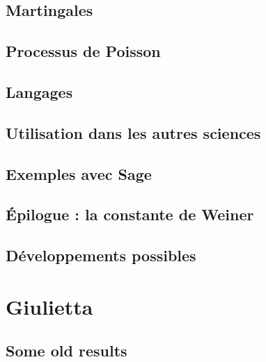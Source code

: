 \documentclass[a4paper,twoside,11pt]{book}
\begin{document}
\chapter{Martingales}


\chapter{Processus de Poisson}


\chapter{Langages}


\chapter{Utilisation dans les autres sciences}



\chapter{Exemples avec Sage}


\chapter{Épilogue : la constante de Weiner}



\chapter{Développements possibles}



\emptyInputPath
{}

\part{Giulietta}



\chapter{Some old results}

\end{document}
